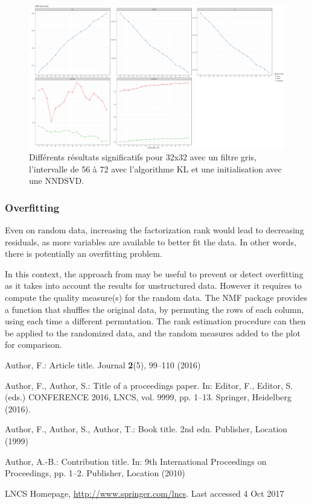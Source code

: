 \documentclass[runningheads]{llncs}
\begin{document}
\begin{figure}
\includegraphics[width=\textwidth]{nmf-32-greyscale-56-72-KL-nndsvd.png}
\caption{Différents r\'esultats significatifs pour 32x32 avec un filtre gris, l'intervalle de 56 à 72 avec l'algorithme KL et une initialisation avec une NNDSVD.} \label{fig6}
\end{figure}


\subsubsection{Overfitting}
Even on random data, increasing the factorization rank would lead to decreasing residuals, as more variables are available to better fit the data.
In other words, there is potentially an overfitting problem. 
 
In this context, the approach from \cite{Frigyesi2008} may be useful to prevent or detect overfitting as it takes into account the results for unstructured data.
However it requires to compute the quality measure(s) for the random data.
The NMF package provides a function that shuffles the original data, by permuting the rows of each column, using each time a different permutation.
The rank estimation procedure can then be applied to the randomized data, and the random measures added to the plot for comparison.


%
%
%
% 
% 
%
\begin{thebibliography}{8}
Author, F.: Article title. Journal \textbf{2}(5), 99--110 (2016)

Author, F., Author, S.: Title of a proceedings paper. In: Editor,
F., Editor, S. (eds.) CONFERENCE 2016, LNCS, vol. 9999, pp. 1--13.
Springer, Heidelberg (2016). 

Author, F., Author, S., Author, T.: Book title. 2nd edn. Publisher,
Location (1999)

Author, A.-B.: Contribution title. In: 9th International Proceedings
on Proceedings, pp. 1--2. Publisher, Location (2010)

LNCS Homepage, \url{http://www.springer.com/lncs}. Last accessed 4
Oct 2017
\end{thebibliography}
\end{document}
